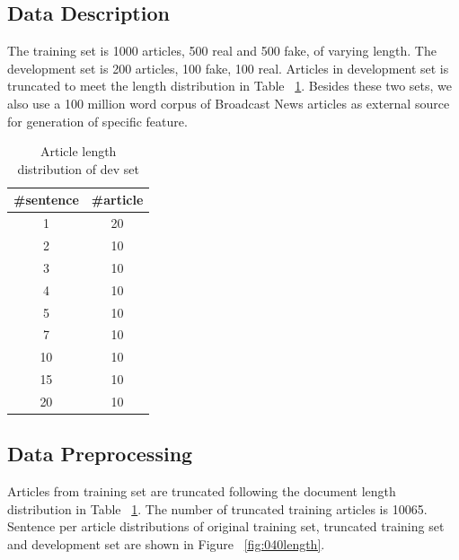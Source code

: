 \subsection{Data Description}
The training set is 1000 articles, 500 real and 500 fake, of varying length. The development set is 200 articles, 100 fake, 100 real. Articles in development set is truncated to meet the length distribution in Table ~\ref{tab:040dev}. Besides these two sets, we also use a 100 million word corpus of Broadcast News articles as external source for generation of specific feature.
\begin{table}
	\begin{center}
		\begin{tabular}{|c|c|}
		\hline
		\#sentence&\#article\\
		\hline
		1&20\\
		2&10\\
		3&10\\
		4&10\\
		5&10\\
		7&10\\
		10&10\\
		15&10\\
		20&10\\
		\hline
		\end{tabular}
	\end{center}
	\label{tab:040dev}
	\caption{Article length distribution of dev set}
\end{table}
\subsection{Data Preprocessing}
Articles from training set are truncated following the document length distribution in Table ~\ref{tab:040dev}. The number of truncated training articles is 10065. Sentence per article distributions of original training set, truncated training set and development set are shown in Figure ~\ref{fig:040length}.

